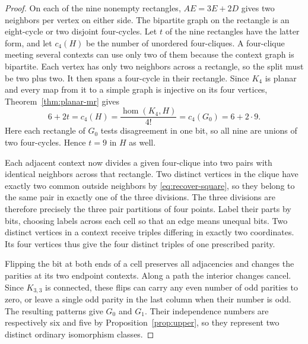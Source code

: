 \documentclass[11pt,reqno]{amsart}
\numberwithin{equation}{section}
\theoremstyle{definition}
\newcommand{\homc}{\operatorname{hom}}
\begin{document}
\begin{proof}
On each of the nine nonempty rectangles, $AE=3E+2D$ gives two neighbors per vertex on either side. The bipartite graph on the rectangle is an eight-cycle or two disjoint four-cycles. Let $t$ of the nine rectangles have the latter form, and let $c_4(H)$ be the number of unordered four-cliques. A four-clique meeting several contexts can use only two of them because the context graph is bipartite. Each vertex has only two neighbors across a rectangle, so the split must be two plus two. It then spans a four-cycle in their rectangle. Since $K_4$ is planar and every map from it to a simple graph is injective on its four vertices, Theorem~\ref{thm:planar-mr} gives
\[
     6+2t=c_4(H)=\frac{\homc(K_4,H)}{4!}
                 =c_4(G_0)=6+2\cdot9 .
\]
Here each rectangle of $G_0$ tests disagreement in one bit, so all nine are unions of two four-cycles. Hence $t=9$ in $H$ as well.

Each adjacent context now divides a given four-clique into two pairs with identical neighbors across that rectangle. Two distinct vertices in the clique have exactly two common outside neighbors by \eqref{eq:recover-square}, so they belong to the same pair in exactly one of the three divisions. The three divisions are therefore precisely the three pair partitions of four points. Label their parts by bits, choosing labels across each cell so that an edge means unequal bits. Two distinct vertices in a context receive triples differing in exactly two coordinates. Its four vertices thus give the four distinct triples of one prescribed parity.

Flipping the bit at both ends of a cell preserves all adjacencies and changes the parities at its two endpoint contexts. Along a path the interior changes cancel. Since $K_{3,3}$ is connected, these flips can carry any even number of odd parities to zero, or leave a single odd parity in the last column when their number is odd. The resulting patterns give $G_0$ and $G_1$. Their independence numbers are respectively six and five by Proposition~\ref{prop:upper}, so they represent two distinct ordinary isomorphism classes.
\end{proof}

\clearpage
\appendix
\end{document}
